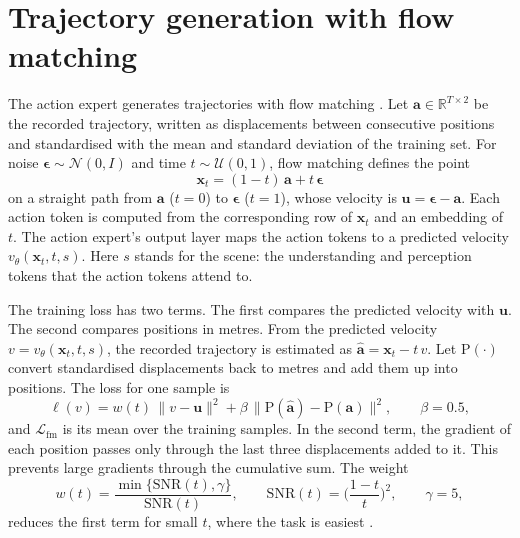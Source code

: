 \documentclass[11pt, a4paper, oneside]{book}
\begin{document}


\section{Trajectory generation with flow matching}
\label{sec:flow}
The action expert generates trajectories with flow matching \cite{flowmatching}. Let
$\mathbf{a}\in\mathbb{R}^{T\times2}$ be the recorded trajectory, written as displacements
between consecutive positions and standardised with the mean and standard deviation of the
training set. For noise $\boldsymbol{\epsilon}\sim\mathcal{N}(0,I)$ and time
$t\sim\mathcal{U}(0,1)$, flow matching defines the point
\begin{equation}
  \mathbf{x}_t=(1-t)\,\mathbf{a}+t\,\boldsymbol{\epsilon}
\end{equation}
on a straight path from $\mathbf{a}$ ($t=0$) to $\boldsymbol{\epsilon}$ ($t=1$), whose
velocity is $\mathbf{u}=\boldsymbol{\epsilon}-\mathbf{a}$. Each action token is computed from
the corresponding row of $\mathbf{x}_t$ and an embedding of $t$. The action expert's output
layer maps the action tokens to a predicted velocity $v_\theta(\mathbf{x}_t,t,s)$. Here $s$
stands for the scene: the understanding and perception tokens that the action tokens attend to.

The training loss has two terms. The first compares the predicted velocity with $\mathbf{u}$.
The second compares positions in metres. From the predicted velocity $v=v_\theta(\mathbf{x}_t,t,s)$,
the recorded trajectory is estimated as $\hat{\mathbf{a}}=\mathbf{x}_t-t\,v$. Let
$\mathrm{P}(\cdot)$ convert standardised displacements back to metres and add them up into
positions. The loss for one sample is
\begin{equation}
  \ell(v)=w(t)\,\big\lVert v-\mathbf{u}\big\rVert^2
  +\beta\,\big\lVert \mathrm{P}(\hat{\mathbf{a}})-\mathrm{P}(\mathbf{a})\big\rVert^2,
  \qquad \beta=0.5,
  \label{eq:fmloss}
\end{equation}
and $\mathcal{L}_{\mathrm{fm}}$ is its mean over the training samples. In the second term, the
gradient of each position passes only through the last three displacements added to it. This
prevents large gradients through the cumulative sum. The weight
\begin{equation}
  w(t)=\frac{\min\{\mathrm{SNR}(t),\gamma\}}{\mathrm{SNR}(t)},\qquad
  \mathrm{SNR}(t)=\Big(\frac{1-t}{t}\Big)^2,\qquad \gamma=5,
\end{equation}
reduces the first term for small $t$, where the task is easiest \cite{minsnr}.
\end{document}
